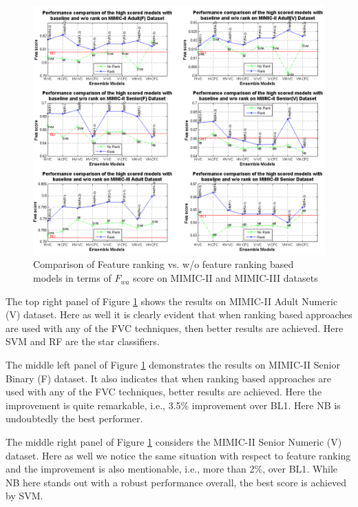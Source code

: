 \begin{figure}[h] 
	\centering 
	\includegraphics[scale=0.5]{fig/rank-comparison-on-all-datasets.png}
	\caption{Comparison of Feature ranking vs. w/o feature ranking based models in terms of $F_{wa}$ score on MIMIC-II and MIMIC-III datasets}
	\label{F:Rank_Comparison_On_MIMICII_MIMICIII}
\end{figure} 

The top right panel of Figure \ref{F:Rank_Comparison_On_MIMICII_MIMICIII} shows the results on MIMIC-II Adult Numeric (V) dataset. Here as well it is clearly evident that when ranking based approaches are used with any of the FVC techniques, then better results are achieved. Here SVM and RF are the star classifiers. 

The middle left panel of Figure \ref{F:Rank_Comparison_On_MIMICII_MIMICIII} demonstrates the results on MIMIC-II Senior Binary (F) dataset. It also indicates that when ranking based approaches are used with any of the FVC techniques, better results are achieved. Here the improvement is quite remarkable, i.e., 3.5\% improvement over BL1. Here NB is undoubtedly the best performer.

The middle right panel of Figure \ref{F:Rank_Comparison_On_MIMICII_MIMICIII} considers the MIMIC-II Senior Numeric (V) dataset. Here as well we notice the same situation with respect to feature ranking and the improvement is also mentionable, i.e., more than 2\%, over BL1. While NB here stands out with a robust performance overall, the best score is achieved by SVM. 

